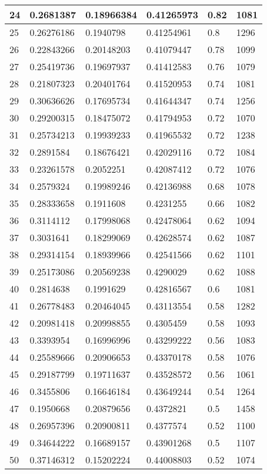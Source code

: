\begin{longtable}{|l|l|l|l|l|l|}
24 & 0.2681387 & 0.18966384 & 0.41265973 & 0.82 & 1081 \\ \hline 
25 & 0.26276186 & 0.1940798 & 0.41254961 & 0.8 & 1296 \\ \hline 
26 & 0.22843266 & 0.20148203 & 0.41079447 & 0.78 & 1099 \\ \hline 
27 & 0.25419736 & 0.19697937 & 0.41412583 & 0.76 & 1079 \\ \hline 
28 & 0.21807323 & 0.20401764 & 0.41520953 & 0.74 & 1081 \\ \hline 
29 & 0.30636626 & 0.17695734 & 0.41644347 & 0.74 & 1256 \\ \hline 
30 & 0.29200315 & 0.18475072 & 0.41794953 & 0.72 & 1070 \\ \hline 
31 & 0.25734213 & 0.19939233 & 0.41965532 & 0.72 & 1238 \\ \hline 
32 & 0.2891584 & 0.18676421 & 0.42029116 & 0.72 & 1084 \\ \hline 
33 & 0.23261578 & 0.2052251 & 0.42087412 & 0.72 & 1076 \\ \hline 
34 & 0.2579324 & 0.19989246 & 0.42136988 & 0.68 & 1078 \\ \hline 
35 & 0.28333658 & 0.1911608 & 0.4231255 & 0.66 & 1082 \\ \hline 
36 & 0.3114112 & 0.17998068 & 0.42478064 & 0.62 & 1094 \\ \hline 
37 & 0.3031641 & 0.18299069 & 0.42628574 & 0.62 & 1087 \\ \hline 
38 & 0.29314154 & 0.18939966 & 0.42541566 & 0.62 & 1101 \\ \hline 
39 & 0.25173086 & 0.20569238 & 0.4290029 & 0.62 & 1088 \\ \hline 
40 & 0.2814638 & 0.1991629 & 0.42816567 & 0.6 & 1081 \\ \hline 
41 & 0.26778483 & 0.20464045 & 0.43113554 & 0.58 & 1282 \\ \hline 
42 & 0.20981418 & 0.20998855 & 0.4305459 & 0.58 & 1093 \\ \hline 
43 & 0.3393954 & 0.16996996 & 0.43299222 & 0.56 & 1083 \\ \hline 
44 & 0.25589666 & 0.20906653 & 0.43370178 & 0.58 & 1076 \\ \hline 
45 & 0.29187799 & 0.19711637 & 0.43528572 & 0.56 & 1061 \\ \hline 
46 & 0.3455806 & 0.16646184 & 0.43649244 & 0.54 & 1264 \\ \hline 
47 & 0.1950668 & 0.20879656 & 0.4372821 & 0.5 & 1458 \\ \hline 
48 & 0.26957396 & 0.20900811 & 0.4377574 & 0.52 & 1100 \\ \hline 
49 & 0.34644222 & 0.16689157 & 0.43901268 & 0.5 & 1107 \\ \hline 
50 & 0.37146312 & 0.15202224 & 0.44008803 & 0.52 & 1074 \\ \hline 
\end{longtable}